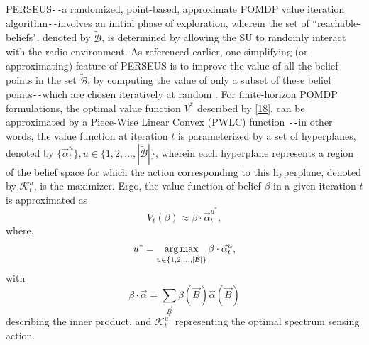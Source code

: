 PERSEUS\texttt{-{}-}a randomized, point-based, approximate POMDP value iteration algorithm\texttt{-{}-}involves an initial phase of exploration, wherein the set of ``reachable-beliefs", denoted by $\tilde{\mathcal{B}}$, is determined by allowing the SU to randomly interact with the radio environment. As referenced earlier, one simplifying (or approximating) feature of PERSEUS is to improve the value of all the belief points in the set $\tilde{\mathcal{B}}$, by computing the value of only a subset of these belief points\texttt{-{}-}which are chosen iteratively at random \cite{WCL:paper}. For finite-horizon POMDP formulations, the optimal value function $V^{*}$ described by \eqref{18}, can be approximated by a Piece-Wise Linear Convex (PWLC) function \cite{WCL:13}\texttt{-{}-}in other words, the value function at iteration $t$ is parameterized by a set of hyperplanes, denoted by $\{\vec{\alpha}_{t}^{u}\},u{\in}\{1,2,\dots,|\tilde{\mathcal{B}}|\}$, wherein each hyperplane represents a region of the belief space for which the action corresponding to this hyperplane, denoted by $\mathcal{K}_{t}^{u}$, is the maximizer. Ergo, the value function of belief $\beta$ in a given iteration $t$ is approximated as
\begin{equation}\label{22}
    V_{t}(\beta) \approx \beta \cdot \vec{\alpha}_{t}^{u^{*}},
\end{equation}
where,
\begin{equation}\label{23}
    u^{*}=\operatorname*{arg\,max}_{u \in \{1,2,\dots,|\tilde{\mathcal{B}}|\}}\beta \cdot \vec{\alpha}_{t}^{u},
\end{equation}
with
\begin{equation}\label{24}
    \beta \cdot \vec{\alpha}=\sum_{\vec{B}}\beta(\vec{B})\vec{\alpha}(\vec{B})
\end{equation}
describing the inner product, and $\mathcal{K}_{t}^{u^{*}}$ representing the optimal spectrum sensing action.

